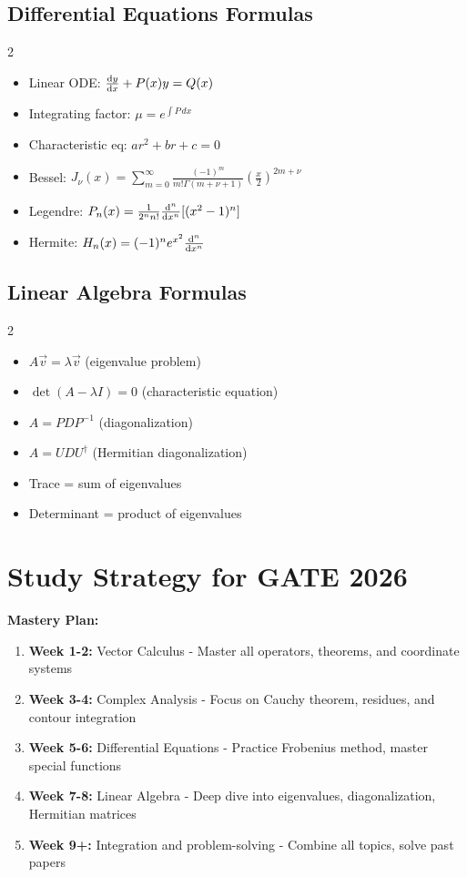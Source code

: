 \documentclass[12pt,a4paper]{article}
\begin{document}
\subsection{Differential Equations Formulas}
\begin{multicols}{2}
\begin{itemize}
    \item Linear ODE: $\dv{y}{x} + P(x)y = Q(x)$
    \item Integrating factor: $\mu = e^{\int P \, dx}$
    \item Characteristic eq: $ar^2 + br + c = 0$
    \item Bessel: $J_\nu(x) = \sum_{m=0}^{\infty} \frac{(-1)^m}{m!\Gamma(m+\nu+1)}\left(\frac{x}{2}\right)^{2m+\nu}$
    \item Legendre: $P_n(x) = \frac{1}{2^n n!}\dv[n]{}{x}[(x^2-1)^n]$
    \item Hermite: $H_n(x) = (-1)^n e^{x^2}\dv[n]{}{x}(e^{-x^2})$
\end{itemize}
\end{multicols}

\subsection{Linear Algebra Formulas}
\begin{multicols}{2}
\begin{itemize}
    \item $A\vec{v} = \lambda\vec{v}$ (eigenvalue problem)
    \item $\det(A - \lambda I) = 0$ (characteristic equation)
    \item $A = PDP^{-1}$ (diagonalization)
    \item $A = UDU^\dagger$ (Hermitian diagonalization)
    \item Trace = sum of eigenvalues
    \item Determinant = product of eigenvalues
\end{itemize}
\end{multicols}

\newpage

\section{Study Strategy for GATE 2026}
\begin{importantbox}
\textbf{Mastery Plan:}
\begin{enumerate}
    \item \textbf{Week 1-2:} Vector Calculus - Master all operators, theorems, and coordinate systems
    \item \textbf{Week 3-4:} Complex Analysis - Focus on Cauchy theorem, residues, and contour integration
    \item \textbf{Week 5-6:} Differential Equations - Practice Frobenius method, master special functions
    \item \textbf{Week 7-8:} Linear Algebra - Deep dive into eigenvalues, diagonalization, Hermitian matrices
    \item \textbf{Week 9+:} Integration and problem-solving - Combine all topics, solve past papers
\end{enumerate}
\end{importantbox}
\end{document}
